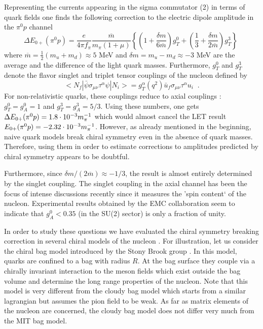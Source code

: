 Representing  the currents appearing in the sigma commutator (2)
in terms of quark fields one finds the 
following correction to the electric dipole amplitude in the 
$\pi^0 p$ channel \cite{SW}
\begin{equation}
\label{result}
\Delta E_{0+}(\pi^0 p) = \frac{e}{4\pi f_\pi}\frac{\overline{m}}{m_\pi (1+\mu)}
  \left\{ \left( 1+\frac{\delta m}{6\overline{m}} \right) g_T^0
     + \left(\frac{1}{3}+\frac{\delta m}{2\overline{m}}\right) g_T^3
     \right\} \; 
\end{equation}
where  $\overline{m}=\frac{1}{2}(m_u  + m_d)  \approx  5$ MeV  and 
$\delta  m=m_u-m_d   \approx  -3$ MeV  are  the  average  and  the 
difference  of the light quark masses.  Furthermore,  $g_T^0$ and 
$g_T^3$ denote the flavor singlet and triplet tensor couplings of 
the nucleon defined by
\begin{equation}
<N_f|\bar{\psi}\sigma_{\mu\nu}\tau^\alpha\psi|N_i>=g_T^\alpha(q^2) 
\bar{u}_f\sigma_{\mu\nu}\tau^\alpha u_i\;\; .
\end{equation}
For non-relativistic  quarks,  these  couplings  reduce  to axial 
couplings :  $g_T^0=g_A^0=1$ and $g_T^3=g_A^3=5/3$.   Using these 
numbers, one gets $\Delta E_{0+} (\pi^0 p)=1.8\cdot 10^{-3}m_\pi^{-1}$ which would almost cancel
the  LET  result  $E_{0+}(\pi^0  p)=-2.32\cdot 10^{-3}m_\pi^{-1}$. However, as already
mentioned in the beginning, naive quark models break chiral symmetry
even in the absence of quark masses. Therefore, using them in order to 
estimate corrections to amplitudes predicted by chiral symmetry appears
to be doubtful. 
  

Furthermore,  since 
$\delta  m/(2\overline{m})\approx  -1/3$,  the  result  is almost 
entirely determined by the singlet coupling. The singlet coupling 
in the axial  channel  has been the focus of intense  discussions 
recently  since  it measures  the 'spin content`  of the nucleon. 
Experimental results obtained by the EMC collaboration \cite{EMC} 
seem to indicate that $g_A^0<0.35$  (in the SU(2) sector) is only 
a fraction of unity.  

In order to study these questions we have evaluated the chiral 
symmetry breaking correction in several chiral models of the 
nucleon \cite{SW}. For illustration, let us consider the chiral
bag model introduced by the Stony Brook group \cite{BR}.
In this model, quarks are confined to a bag with radius $R$. At the
bag surface they couple via a chirally invariant interaction to the
meson fields which exist outside the bag volume and determine the
long range properties of the nucleon. Note that this model is very 
different from the cloudy bag model which starts from a similar 
lagrangian but assumes the pion field to be weak. As far as matrix 
elements of the nucleon are concerned, the cloudy bag model does not differ
very much from the MIT bag model.  

